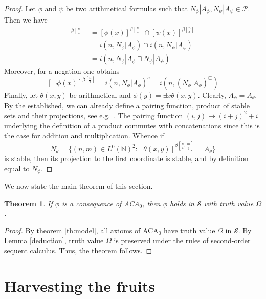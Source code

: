 \documentclass{jloganal}
\numberwithin{equation}{section}
\theoremstyle{plain}
\newtheorem{theorem}[subsection]{Theorem}
\newcommand\N{\mathbb{N}}
\begin{document}
\begin{proof}
Let $\phi$ and $\psi$ be two arithmetical formulas such that $N_\phi|A_\phi, N_\psi|A_\psi\in \mathcal{P}$. 
Then we have 
\begin{align*}
[(\phi\wedge \psi)(x)]^{\beta[\frac{n}{x}]}&=[\phi(x)]^{\beta[\frac{n}{x}]} \cap [\psi(x)]^{\beta[\frac{n}{x}]}\\
&=i(n,N_\phi|A_\phi)\cap i(n,N_\psi|A_\psi) \\
&=i(n,N_\phi|A_\phi \sqcap N_\psi|A_\psi)
\end{align*}
Moreover, for a negation one obtains 
\[
[\neg \phi(x)]^{\beta[\frac{n}{x}]}=i(n,N_\phi|A_\phi)^c=i(n,(N_\phi|A_\phi)^\sqsubset)
\]
Finally, let $\theta(x,y)$ be arithmetical and $\phi(y)=\exists x \theta(x,y)$.  
Clearly, $A_\phi=A_\theta$.  
By the established, we can already define a pairing function, product of stable sets and their projections, see e.g.~\cite[p.~66-69]{simpson2009subsystems}.  
The pairing function $(i,j)\mapsto (i+j)^2 +i$ underlying the definition of a product commutes with concatenations since this is the case for addition and multiplication.  
Whence if 
\[
N_\theta=\{(n,m)\in L^0(\N)^2\colon [\theta(x,y)]^{\beta[\frac{n}{x},\frac{m}{y}]}=A_\theta\}
\]
is stable, then its projection to the first coordinate is stable, and by definition equal to $N_\phi$. 
\end{proof}

We now state the main theorem of this section. 

\begin{theorem}\label{transfer}
If $\phi$ is a consequence of ACA$_{0}$, then $\phi$ holds in $\mathcal{S}$ with truth value $\Omega$.
\end{theorem}
\begin{proof}
 By theorem \ref{th:model}, all axioms of ACA$_{0}$ have truth value $\Omega$ in $\mathcal{S}$.
 By Lemma \ref{deduction}, truth value $\Omega$ is preserved under the rules of second-order sequent calculus. 
 Thus, the theorem follows.
\end{proof}

\section{Harvesting the fruits}\label{s4} 
\end{document}

